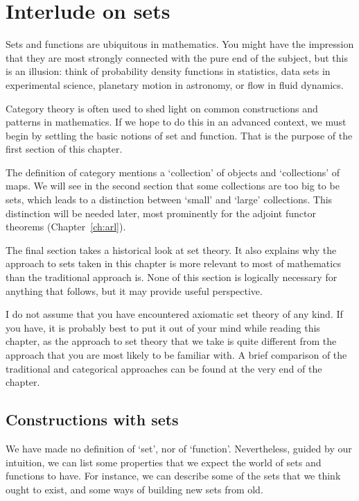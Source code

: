\chapter{Interlude on sets}
\label{ch:sets}

Sets and functions are ubiquitous in mathematics.  You might have the
impression that they are most strongly connected with the pure end of the
subject, but this is an illusion: think of probability density functions in
statistics, data sets in experimental science, planetary motion in
astronomy, or flow in fluid dynamics.

Category theory is often used to shed light on common constructions and
patterns in mathematics.  If we hope to do this in an advanced context, we
must begin by settling the basic notions of set and function.  That is the
purpose of the first section of this chapter.

The definition of category mentions a `collection' of objects and
`collections' of maps.  We will see in the second section that some
collections are too big to be sets, which leads to a distinction between
`small' and `large' collections.  This distinction will be needed later,
most prominently for the adjoint functor theorems (Chapter~\ref{ch:arl}).

The final section takes a historical look at set theory.  It also explains
why the approach to sets taken in this chapter is more relevant to most of
mathematics than the traditional approach is.  None of this section is
logically necessary for anything that follows, but it may provide useful
perspective.

I do not assume that you have encountered axiomatic set theory of any kind.
If you have, it is probably best to put it out of your mind while reading
this chapter, as the approach to set theory that we take is quite different
from the approach that you are most likely to be familiar with.  A brief
comparison of the traditional and categorical approaches can be found at
the very end of the chapter.



\section{Constructions with sets}
\label{sec:Set-properties}


We have made no definition of `set', nor of `function'.  Nevertheless,
guided by our intuition, we can list some properties that we expect the
world of sets and functions to have.  For instance, we can describe some
of the sets that we think ought to exist, and some ways of building new
sets from old.

